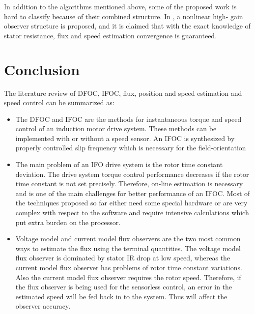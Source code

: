 In addition to the algorithms mentioned above, some of the proposed work is hard to classify because of their combined structure. In \cite{J}, a nonlinear high- gain observer structure is proposed, and it is claimed that with the exact knowledge of stator resistance, flux and speed estimation convergence is guaranteed.

\section{Conclusion}

The literature review of DFOC, IFOC, flux, position and speed estimation and speed control can be summarized as:
\begin{itemize}

\item{The DFOC and IFOC are the methods for instantaneous torque and speed control of an induction motor drive system. These methods can be implemented with or without a speed sensor. An IFOC is synthesized by properly controlled slip frequency which is necessary for the field-orientation}\\
\item{The main problem of an IFO drive system is the rotor time constant deviation. The drive system torque control performance decreases if the rotor time constant is not set precisely. Therefore, on-line estimation is necessary and is one of the main challenges for better performance of an IFOC. Most of the techniques proposed so far either need some special hardware or are very complex with respect to the software and require intensive calculations which put extra burden on the processor.}\\
\item{Voltage model and current model flux observers are the two most common ways to estimate the flux using the terminal quantities. The voltage model flux observer is dominated by stator IR drop at low speed, whereas the current model flux observer has problems of rotor time constant variations. Also the current model flux observer requires the rotor speed. Therefore, if the flux observer is being used for the sensorless control, an error in the estimated speed will be fed back in to the system. Thus will affect the observer accuracy.}\\

\end{itemize}
